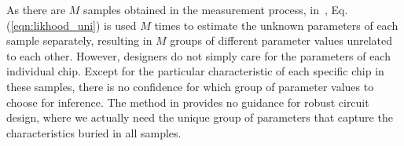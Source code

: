 \documentclass[referee]{ieice}
\begin{document}
As there are $M$ samples obtained in the measurement process,
in~\cite{Hargreaves08}, %
Eq.(\ref{eqn:likhood_uni}) is used $M$ times to estimate the unknown parameters of each sample separately,
resulting in $M$ groups of different parameter values unrelated to each other.
However, designers do not simply care for the parameters of each individual chip.
Except for the particular characteristic of each specific chip in these samples,
there is no confidence for which group of parameter values to choose for inference.
The method in \cite{Hargreaves08} provides no guidance for robust circuit design,
where we actually need the unique group of parameters that capture the characteristics buried in all samples.
\end{document}
